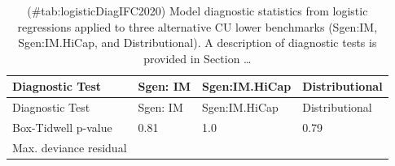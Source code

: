 \documentclass[
]{article}
\begin{document}
\begin{longtable}[]{@{}llll@{}}
\caption{(\#tab:logisticDiagIFC2020) Model diagnostic statistics from
logistic regressions applied to three alternative CU lower benchmarks
(Sgen:IM, Sgen:IM.HiCap, and Distributional). A description of
diagnostic tests is provided in Section \ldots{}}\tabularnewline
\toprule
\begin{minipage}[b]{0.30\columnwidth}\raggedright
Diagnostic Test\strut
\end{minipage} & \begin{minipage}[b]{0.17\columnwidth}\raggedright
Sgen: IM\strut
\end{minipage} & \begin{minipage}[b]{0.21\columnwidth}\raggedright
Sgen:IM.HiCap\strut
\end{minipage} & \begin{minipage}[b]{0.21\columnwidth}\raggedright
Distributional\strut
\end{minipage}\tabularnewline
\midrule
\endfirsthead
\toprule
\begin{minipage}[b]{0.30\columnwidth}\raggedright
Diagnostic Test\strut
\end{minipage} & \begin{minipage}[b]{0.17\columnwidth}\raggedright
Sgen: IM\strut
\end{minipage} & \begin{minipage}[b]{0.21\columnwidth}\raggedright
Sgen:IM.HiCap\strut
\end{minipage} & \begin{minipage}[b]{0.21\columnwidth}\raggedright
Distributional\strut
\end{minipage}\tabularnewline
\midrule
\endhead
\begin{minipage}[t]{0.30\columnwidth}\raggedright
Box-Tidwell p-value\strut
\end{minipage} & \begin{minipage}[t]{0.17\columnwidth}\raggedright
0.81\strut
\end{minipage} & \begin{minipage}[t]{0.21\columnwidth}\raggedright
1.0\strut
\end{minipage} & \begin{minipage}[t]{0.21\columnwidth}\raggedright
0.79\strut
\end{minipage}\tabularnewline
\begin{minipage}[t]{0.30\columnwidth}\raggedright
Max. deviance residual\strut
\end{minipage} & \begin{minipage}[t]{0.17\columnwidth}\raggedright

\end{minipage}
\end{longtable}
\end{document}
